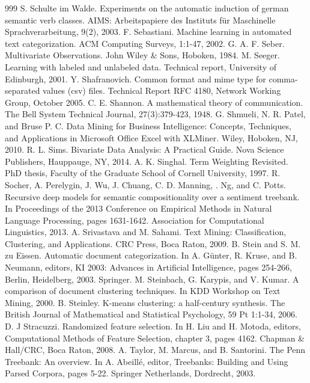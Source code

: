 \documentclass[11pt,openany,executivepaper]{book}
\begin{document}
\begin{thebibliography}{999}
 S. Schulte im Walde. Experiments on the automatic induction of german semantic verb classes. AIMS: Arbeitspapiere des Instituts für Maschinelle Sprachverarbeitung, 9(2), 2003.
 F. Sebastiani. Machine learning in automated text categorization. ACM Computing Surveys, 1:1-47, 2002.
 G. A. F. Seber. Multivariate Observations. John Wiley \& Sons, Hoboken, 1984.
 M. Seeger. Learning with labeled and unlabeled data. Technical report, University of Edinburgh, 2001.
 Y. Shafranovich. Common format and mime type for comma-separated values (csv) files. Technical Report RFC 4180, Network Working Group, October 2005.
 C. E. Shannon. A mathematical theory of communication. The Bell System Technical Journal, 27(3):379-423, 1948.
 G. Shmueli, N. R. Patel, and Bruse P. C. Data Mining for Business Intelligence: Concepts, Techniques, and Applications in Microsoft Office Excel with XLMiner. Wiley, Hoboken, NJ, 2010.
 R. L. Sims. Bivariate Data Analysis: A Practical Guide. Nova Science Publishers, Hauppauge, NY, 2014.
 A. K. Singhal. Term Weighting Revisited. PhD thesis, Faculty of the Graduate School of Cornell University, 1997.
 R. Socher, A. Perelygin, J. Wu, J. Chuang, C. D. Manning, . Ng, and C. Potts. Recursive deep models for semantic compositionality over a sentiment treebank. In Proceedings of the 2013 Conference on Empirical Methods in Natural Language Processing, pages 1631-1642. Association for Computational Linguistics, 2013.
 A. Srivastava and M. Sahami. Text Mining: Classification, Clustering, and Applications. CRC Press, Boca Raton, 2009.
 B. Stein and S. M. zu Eissen. Automatic document categorization. In A. Günter, R. Kruse, and B. Neumann, editors, KI 2003: Advances in Artificial Intelligence, pages 254-266, Berlin, Heidelberg, 2003. Springer.
 M. Steinbach, G. Karypis, and V. Kumar. A comparison of document clustering techniques. In KDD Workshop on Text Mining, 2000.
 B. Steinley. K-means clustering: a half-century synthesis. The British Journal of Mathematical and Statistical Psychology, 59 Pt 1:1-34, 2006.
 D. J Stracuzzi. Randomized feature selection. In H. Liu and H. Motoda, editors, Computational Methods of Feature Selection, chapter 3, pages 4162. Chapman \& Hall/CRC, Boca Raton, 2008.
 A. Taylor, M. Marcus, and B. Santorini. The Penn Treebank: An overview. In A. Abeillé, editor, Treebanks: Building and Using Parsed Corpora, pages 5-22. Springer Netherlands, Dordrecht, 2003.

\end{thebibliography}
\end{document}
